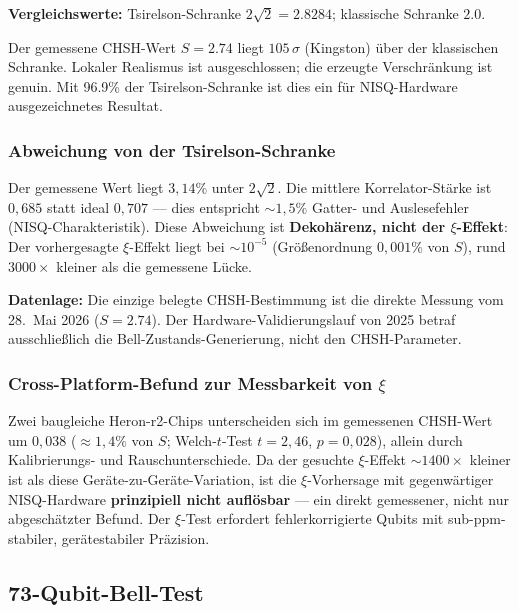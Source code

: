 \textbf{Vergleichswerte:} Tsirelson-Schranke $2\sqrt{2} = 2.8284$; klassische Schranke $2.0$.

\begin{keyresult}
	Der gemessene CHSH-Wert $S = 2.74$ liegt $105\,\sigma$ (Kingston) über der klassischen Schranke. Lokaler Realismus ist ausgeschlossen; die erzeugte Verschränkung ist genuin. Mit 96.9\% der Tsirelson-Schranke ist dies ein für NISQ-Hardware ausgezeichnetes Resultat.
\end{keyresult}

\subsubsection{Abweichung von der Tsirelson-Schranke}

Der gemessene Wert liegt $3{,}14\%$ unter $2\sqrt{2}$. Die mittlere Korrelator-Stärke ist $0{,}685$ statt ideal $0{,}707$ --- dies entspricht $\sim 1{,}5\%$ Gatter- und Auslesefehler (NISQ-Charakteristik). Diese Abweichung ist \textbf{Dekohärenz, nicht der $\xi$-Effekt}: Der vorhergesagte $\xi$-Effekt liegt bei $\sim 10^{-5}$ (Größenordnung $0{,}001\%$ von $S$), rund $3000\times$ kleiner als die gemessene Lücke.

\begin{important}
	\textbf{Datenlage:} Die einzige belegte CHSH-Bestimmung ist die direkte Messung vom 28.~Mai 2026 ($S = 2.74$). Der Hardware-Validierungslauf von 2025 betraf ausschließlich die Bell-Zustands-Generierung, nicht den CHSH-Parameter.
\end{important}

\subsubsection{Cross-Platform-Befund zur Messbarkeit von $\xi$}

Zwei baugleiche Heron-r2-Chips unterscheiden sich im gemessenen CHSH-Wert um $0{,}038$ ($\approx 1{,}4\%$ von $S$; Welch-$t$-Test $t=2{,}46$, $p=0{,}028$), allein durch Kalibrierungs- und Rauschunterschiede. Da der gesuchte $\xi$-Effekt $\sim 1400\times$ kleiner ist als diese Geräte-zu-Geräte-Variation, ist die $\xi$-Vorhersage mit gegenwärtiger NISQ-Hardware \textbf{prinzipiell nicht auflösbar} --- ein direkt gemessener, nicht nur abgeschätzter Befund. Der $\xi$-Test erfordert fehlerkorrigierte Qubits mit sub-ppm-stabiler, gerätestabiler Präzision.

\subsection{73-Qubit-Bell-Test}

